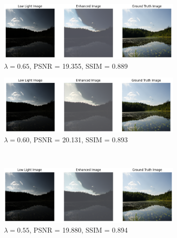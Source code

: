 \documentclass[a4paper]{ctexart}
\begin{document}
		\begin{figure}[htbp]
			\centering
			\begin{subfigure}{0.45\textwidth}
				\includegraphics[width=\linewidth]{picture/LLIE/Experiment/myplot_skip_stem_lambda_0.65}
				\caption{$\lambda = 0.65$, PSNR = 19.355, SSIM = 0.889}
				\label{fig: lambda = 0.65}	
			\end{subfigure}
			\begin{subfigure}{0.45\textwidth}
				\includegraphics[width=\linewidth]{picture/LLIE/Experiment/myplot_skip_stem_lambda_0.60}
				\caption{$\lambda = 0.60$, PSNR = 20.131, SSIM = 0.893}
				\label{fig: lambda = 0.60}	
			\end{subfigure}\\
			\begin{subfigure}{0.45\textwidth}
				\includegraphics[width=\linewidth]{picture/LLIE/Experiment/myplot_skip_stem_lambda_0.55}
				\caption{$\lambda = 0.55$, PSNR = 19.880, SSIM = 0.894}
				\label{fig: lambda = 0.55}	
			\end{subfigure}
			\begin{subfigure}{0.45\textwidth}

\end{subfigure}
\end{figure}
\end{document}
